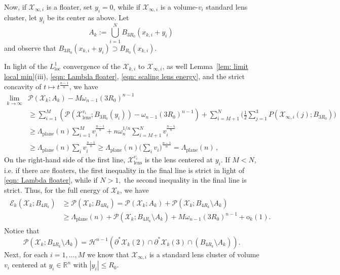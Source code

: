 \documentclass[10pt,reqno]{amsart}
\numberwithin{equation}{section}
\theoremstyle{definition}
\newcommand{\Pcal}{\mathcal{P}}
\newcommand{\R}{\mathbb{R}}
\newcommand{\loc}{\mathrm{loc}}
\DeclareMathOperator{\lens}{lens}
\DeclareMathOperator{\plane}{plane}
\newcommand{\X}{\mathcal{X}}
\begin{document}
{Now, if $\X_{\infty, i}$ is a floater, set $y_i=0$, while if $\X_{\infty, i}$ is a volume-$v_i$ standard lens cluster, let $y_i$ be its center as above. Let
\[
    A_k := \bigcup_{i=1}^N B_{3R_0}(x_{k,i}+y_i)\,
\]
and observe that $B_{3R_0}(x_{k,i}+y_i) \supset B_{R_0}(x_{k,i}).$


In light of the $L^1_\loc$ convergence of the $\X_{k, i}$ to $\X_{\infty,i}$, as well Lemma~\ref{lem: limit local min}(iii), \eqref{eqn: Lambda floater}, \eqref{eqn: scaling lens energy}, and the strict concavity of $t \mapsto t^{\frac{n-1}{n}}$, we have 
\begin{equation*}
    \begin{split}
    \lim_{k\to\infty}& \Pcal(\X_k;A_k) - M \omega_{n-1} (3R_0)^{n-1}\\
    & \geq
    \sum_{i=1}^M \left(\Pcal(\X_{\lens}^{v_i};B_{3R_0}(y_i)) - \omega_{n-1} (3R_0)^{n-1}\right)
    +\sum_{i=M+1}^N \bigg(\frac{1}{2} \sum_{j=1}^3 P(\X_{\infty,i}(j); B_{3R_0})\bigg) \\
    & \geq  \Lambda_{\plane}(n) \sum_{i=1}^M v_i^{\frac{n-1}{n}} 
    + n\omega_n^{1/n} \sum_{i=M+1}^N v_i^{\frac{n-1}{n}}
     \\
    & \geq \Lambda_{\plane}(n) \sum_{i}v_i^{\frac{n-1}{n}} \geq 
 \Lambda_{\plane}(n) \Big(\sum_{i}v_i \Big)^{\frac{n-1}{n}}= \Lambda_{\plane}(n)\,,        
    \end{split}
\end{equation*}
On the right-hand side of the first line, $\X_{\lens}^{v_i}$ is the lens centered at $y_i.$ If $M<N$, i.e. if there are floaters, the first inequality in the final line is strict in light of \eqref{eqn: Lambda floater}, while if $N>1,$ the second inequality in the final line is strict.
 Thus, for the full energy of $\X_k$, we have
 \begin{align}
 \begin{split}
      \label{eqn: lb for part of energy}
     \mathcal{E}_k(\X_k;B_{4R_k})&\geq  \Pcal(\X_k;B_{4R_k}) 
     = \Pcal(\X_k;A_k) + \Pcal(\X_k; B_{4R_k}\setminus A_k)  \\
     & \geq  \Lambda_{\plane}(n) + \Pcal(\X_k; B_{4R_k}\setminus A_k) + M \omega_{n-1}(3R_0)^{n-1} +\mathrm{o}_k(1). 
     \end{split}
 \end{align}
Notice that 
\[
\Pcal(\X_k; B_{4R_k}\setminus A_k) = \mathcal{H}^{n-1}(\partial^*\X_k(2) \cap \partial^*\X_k(3) \cap ( B_{4R_k}\setminus A_k)).
\]
Next, for each $i=1,\dots , M$ we know that $\X_{\infty,i}$ is a standard lens cluster {of volume $v_i$} centered at $y_i\in \R^n$ with $|y_i|\leq R_0$.
}
\end{document}
